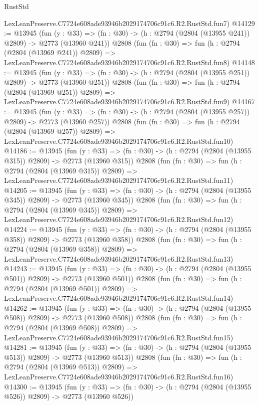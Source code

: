 \begin{lexlean}{RustStd}
\begin{coremodule}
    LexLeanPreserve.C7724e608ade93946b2029174706c91c6.R2.RustStd.fun7)
@14129 := @13945
    (fun (y : @33) => (fn : @30) -> (h : @2794 (@2804 (@13955 @241)) @2809) -> @2773 (@13960 @241))
    @2808
    (fun (fn : @30) =>
    fun (h : @2794 (@2804 (@13969 @241)) @2809) =>
    LexLeanPreserve.C7724e608ade93946b2029174706c91c6.R2.RustStd.fun8)
@14148 := @13945
    (fun (y : @33) => (fn : @30) -> (h : @2794 (@2804 (@13955 @251)) @2809) -> @2773 (@13960 @251))
    @2808
    (fun (fn : @30) =>
    fun (h : @2794 (@2804 (@13969 @251)) @2809) =>
    LexLeanPreserve.C7724e608ade93946b2029174706c91c6.R2.RustStd.fun9)
@14167 := @13945
    (fun (y : @33) => (fn : @30) -> (h : @2794 (@2804 (@13955 @257)) @2809) -> @2773 (@13960 @257))
    @2808
    (fun (fn : @30) =>
    fun (h : @2794 (@2804 (@13969 @257)) @2809) =>
    LexLeanPreserve.C7724e608ade93946b2029174706c91c6.R2.RustStd.fun10)
@14186 := @13945
    (fun (y : @33) => (fn : @30) -> (h : @2794 (@2804 (@13955 @315)) @2809) -> @2773 (@13960 @315))
    @2808
    (fun (fn : @30) =>
    fun (h : @2794 (@2804 (@13969 @315)) @2809) =>
    LexLeanPreserve.C7724e608ade93946b2029174706c91c6.R2.RustStd.fun11)
@14205 := @13945
    (fun (y : @33) => (fn : @30) -> (h : @2794 (@2804 (@13955 @345)) @2809) -> @2773 (@13960 @345))
    @2808
    (fun (fn : @30) =>
    fun (h : @2794 (@2804 (@13969 @345)) @2809) =>
    LexLeanPreserve.C7724e608ade93946b2029174706c91c6.R2.RustStd.fun12)
@14224 := @13945
    (fun (y : @33) => (fn : @30) -> (h : @2794 (@2804 (@13955 @358)) @2809) -> @2773 (@13960 @358))
    @2808
    (fun (fn : @30) =>
    fun (h : @2794 (@2804 (@13969 @358)) @2809) =>
    LexLeanPreserve.C7724e608ade93946b2029174706c91c6.R2.RustStd.fun13)
@14243 := @13945
    (fun (y : @33) => (fn : @30) -> (h : @2794 (@2804 (@13955 @501)) @2809) -> @2773 (@13960 @501))
    @2808
    (fun (fn : @30) =>
    fun (h : @2794 (@2804 (@13969 @501)) @2809) =>
    LexLeanPreserve.C7724e608ade93946b2029174706c91c6.R2.RustStd.fun14)
@14262 := @13945
    (fun (y : @33) => (fn : @30) -> (h : @2794 (@2804 (@13955 @508)) @2809) -> @2773 (@13960 @508))
    @2808
    (fun (fn : @30) =>
    fun (h : @2794 (@2804 (@13969 @508)) @2809) =>
    LexLeanPreserve.C7724e608ade93946b2029174706c91c6.R2.RustStd.fun15)
@14281 := @13945
    (fun (y : @33) => (fn : @30) -> (h : @2794 (@2804 (@13955 @513)) @2809) -> @2773 (@13960 @513))
    @2808
    (fun (fn : @30) =>
    fun (h : @2794 (@2804 (@13969 @513)) @2809) =>
    LexLeanPreserve.C7724e608ade93946b2029174706c91c6.R2.RustStd.fun16)
@14300 := @13945
    (fun (y : @33) => (fn : @30) -> (h : @2794 (@2804 (@13955 @526)) @2809) -> @2773 (@13960 @526))

\end{coremodule}
\end{lexlean}
